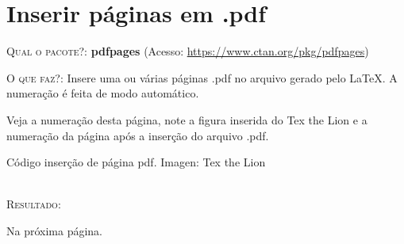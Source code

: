 \chapter{Inserir páginas em .pdf}

\textsc{Qual o pacote?}: \textbf{pdfpages} (Acesso: \url{https://www.ctan.org/pkg/pdfpages})

\textsc{O que faz?}: Insere uma ou várias páginas .pdf no arquivo gerado pelo \LaTeX. A numeração é feita de modo automático.

Veja a numeração desta página, note a figura inserida do Tex the Lion e a numeração da página após a inserção do arquivo .pdf.
\ \\

\begin{codex}{Código inserção de página pdf. Imagen: Tex the Lion}

\end{codex}
\ \\

\textsc{Resultado}:

Na próxima página.

